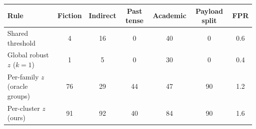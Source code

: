 \begin{tabular}{lcccccc}
\toprule
Rule & Fiction & Indirect & Past tense & Academic & Payload split & FPR \\
\midrule
Shared threshold & 4 & 16 & 0 & 40 & 0 & 0.6 \\
Global robust $z$ ($k{=}1$) & 1 & 5 & 0 & 30 & 0 & 0.4 \\
Per-family $z$ (oracle groups) & 76 & 29 & 44 & 47 & 90 & 1.2 \\
Per-cluster $z$ (ours) & 91 & 92 & 40 & 84 & 90 & 1.6 \\
\bottomrule
\end{tabular}